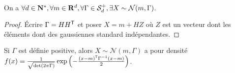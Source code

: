 	\begin{pop}
		On a $\forall d \in \mathbf{N}^*, \forall m \in \mathbf{R}^d, \forall \Gamma \in \mathcal{S}_d^+, \exists X \sim \mathcal{N}(m,\Gamma)$.
	\end{pop}
	
	\begin{proof}
		Écrire $\Gamma = H H^\mathsf{T}$ et poser $X = m + HZ$ où $Z$ est un vecteur dont les éléments dont des gaussiennes standard indépendantes.
	\end{proof}
	
	\begin{pop}
		Si $\Gamma$ est définie positive, alors $X \sim \mathcal{N}(m,\Gamma)$ a pour densité $f(x) = \frac{1}{\sqrt{\det(2 \pi \Gamma)}} \exp \left( - \frac{(x - m)^\mathsf{T} \Gamma^{-1} (x - m)}{2} \right)$.
	\end{pop}